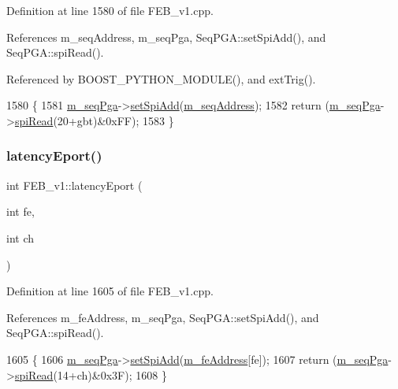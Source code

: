 Definition at line 1580 of file F\+E\+B\+\_\+v1.\+cpp.



References m\+\_\+seq\+Address, m\+\_\+seq\+Pga, Seq\+P\+G\+A\+::set\+Spi\+Add(), and Seq\+P\+G\+A\+::spi\+Read().



Referenced by B\+O\+O\+S\+T\+\_\+\+P\+Y\+T\+H\+O\+N\+\_\+\+M\+O\+D\+U\+L\+E(), and ext\+Trig().


\begin{DoxyCode}
1580                                 \{
1581   \hyperlink{classFEB__v1_a6c7804ac86796f233a8393043adf2e77}{m\_seqPga}->\hyperlink{classSeqPGA_ac998ce3a6d9b5f2e88cc8393f8c1df53}{setSpiAdd}(\hyperlink{classFEB__v1_a1c1eb093fd1733b9510fcf8bc5c7ad08}{m\_seqAddress});
1582   \textcolor{keywordflow}{return} (\hyperlink{classFEB__v1_a6c7804ac86796f233a8393043adf2e77}{m\_seqPga}->\hyperlink{classSeqPGA_ab3d0e5e5d4014bc7a92588a76b8713d4}{spiRead}(20+gbt)&0xFF);
1583 \}
\end{DoxyCode}
\mbox{\label{classFEB__v1_a8ab1ff429d357779d682bdf28504bdd2}} 
\subsubsection{\texorpdfstring{latency\+Eport()}{latencyEport()}\hspace{0.1cm}{\footnotesize\ttfamily [2/2]}}
{\footnotesize\ttfamily int F\+E\+B\+\_\+v1\+::latency\+Eport (\begin{DoxyParamCaption}\item[{int}]{fe,  }\item[{int}]{ch }\end{DoxyParamCaption})}



Definition at line 1605 of file F\+E\+B\+\_\+v1.\+cpp.



References m\+\_\+fe\+Address, m\+\_\+seq\+Pga, Seq\+P\+G\+A\+::set\+Spi\+Add(), and Seq\+P\+G\+A\+::spi\+Read().


\begin{DoxyCode}
1605                                        \{
1606   \hyperlink{classFEB__v1_a6c7804ac86796f233a8393043adf2e77}{m\_seqPga}->\hyperlink{classSeqPGA_ac998ce3a6d9b5f2e88cc8393f8c1df53}{setSpiAdd}(\hyperlink{classFEB__v1_a4e1945c2d5b434125f375e9d0fc6d99f}{m\_feAddress}[fe]);
1607   \textcolor{keywordflow}{return} (\hyperlink{classFEB__v1_a6c7804ac86796f233a8393043adf2e77}{m\_seqPga}->\hyperlink{classSeqPGA_ab3d0e5e5d4014bc7a92588a76b8713d4}{spiRead}(14+ch)&0x3F);
1608 \}
\end{DoxyCode}
\mbox{\label{classFEB__v1_a42cc3f61fd94d4de68eb605b04fb1e74}} 

